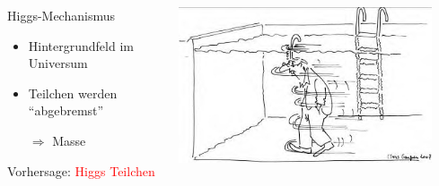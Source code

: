 \documentclass{beamer}
\begin{document}
\begin{frame}
\begin{columns}
\begin{column}{0.5\textwidth}
      \begin{block}{Higgs-Mechanismus}
        \begin{itemize}
        \item Hintergrundfeld im Universum
        \item Teilchen werden ``abgebremst''
        \item[$\Rightarrow$] \alert{Masse}
        \end{itemize}
      \end{block}
      \vskip0.2cm
      \large Vorhersage: \textcolor{red}{Higgs Teilchen}
    \end{column}
    \begin{column}{0.5\textwidth}
      \centering
      \includegraphics[width=0.9\textwidth]{sm/higgs_swim.jpg}
    \end{column}
  \end{columns}
\end{frame}
\end{document}
